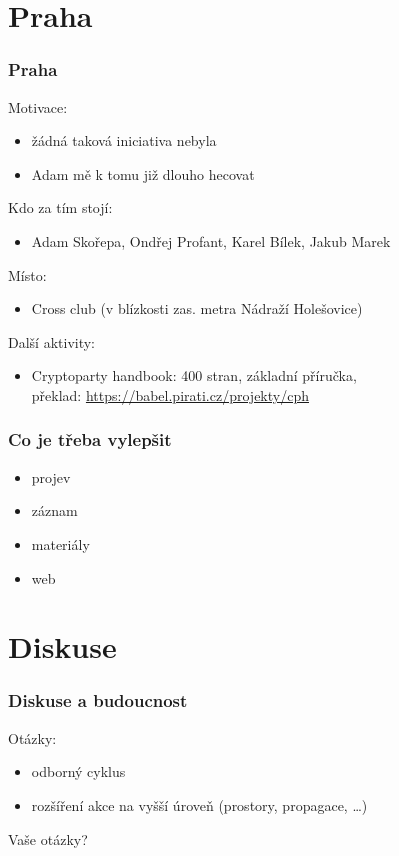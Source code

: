 \documentclass[xetex]{beamer}
\begin{document}
\section{Praha}
\begin{frame}
 \frametitle{Praha}
 Motivace:
 \begin{itemize} 
   \item žádná taková iniciativa nebyla
   \item Adam mě k tomu již dlouho hecovat
 \end{itemize}
 
 Kdo za tím stojí: 
 \begin{itemize}
 \item Adam Skořepa, Ondřej Profant, Karel Bílek, Jakub Marek
 \end{itemize}
 
 Místo:
 \begin{itemize}
   \item Cross club (v blízkosti zas. metra Nádraží Holešovice)
 \end{itemize} 
 Další aktivity:
 \begin{itemize}
   \item Cryptoparty handbook: 400 stran, základní příručka,\\
   překlad: \url{https://babel.pirati.cz/projekty/cph}
 \end{itemize} 
\end{frame}

\begin{frame}
	\frametitle{Co je třeba vylepšit}
	\begin{itemize}
		\item projev
		\item záznam
		\item materiály
		\item web
	\end{itemize}
\end{frame}

\section{Diskuse}
\begin{frame}
	\frametitle{Diskuse a budoucnost}
	Otázky:
	\begin{itemize}
		\item odborný cyklus
		\item rozšíření akce na vyšší úroveň (prostory, propagace, \ldots{})
	\end{itemize}
	
	Vaše otázky?
\end{frame}
\end{document}
